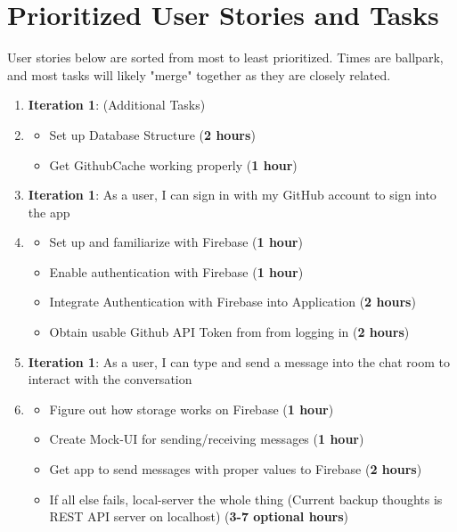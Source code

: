 \documentclass{report}
\begin{document}
\section{Prioritized User Stories and Tasks}

User stories below are sorted from most to least prioritized. Times are ballpark, and most tasks will likely "merge" together as they are closely related.

\begin{enumerate}
    \item \textbf{Iteration 1}: (Additional Tasks)
    \item[] \begin{itemize}
        \item Set up Database Structure (\textbf{2 hours})
        \item Get GithubCache working properly (\textbf{1 hour})
    \end{itemize}
    \item \textbf{Iteration 1}: As a user, I can sign in with my GitHub account to sign into the app
    \item[] \begin{itemize}
        \item Set up and familiarize with Firebase (\textbf{1 hour})
        \item Enable authentication with Firebase (\textbf{1 hour})
        \item Integrate Authentication with Firebase into Application (\textbf{2 hours})
        \item Obtain usable Github API Token from from logging in (\textbf{2 hours})
    \end{itemize}
    \item \textbf{Iteration 1}: As a user, I can type and send a message into the chat room to interact with the conversation
    \item[] \begin{itemize}
        \item Figure out how storage works on Firebase (\textbf{1 hour})
        \item Create Mock-UI for sending/receiving  messages (\textbf{1 hour})
        \item Get app to send messages with proper values to Firebase (\textbf{2 hours})
        \item If all else fails, local-server the whole thing (Current backup thoughts is REST API server on localhost) (\textbf{3-7 optional hours})
    \end{itemize}

\end{enumerate}
\end{document}
